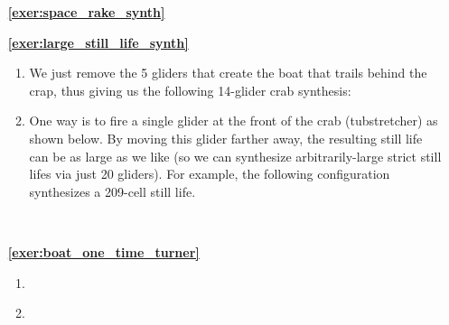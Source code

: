 \begin{multicols}{2}
\begin{itemize}[leftmargin=0em]
\begin{enumerate}[leftmargin=1.5em,label=\bf\color{ocre}(\alph*)]
			\item {} \\
		\end{enumerate}
		
		
		\item[\bf\color{ocre}\sffamily\ref{exer:space_rake_synth}]  \\
		
		
		\item[\bf\color{ocre}\sffamily\ref{exer:large_still_life_synth}]
		\begin{enumerate}[leftmargin=1.5em,label=\bf\color{ocre}(\alph*),series=solu_one_time]
			\item We just remove the 5 gliders that create the boat that trails behind the crap, thus giving us the following 14-glider crab synthesis:
			\begin{center}
			\end{center}
			
			\item One way is to fire a single glider at the front of the crab (tubstretcher) as shown below. By moving this glider farther away, the resulting still life can be as large as we like (so we can synthesize arbitrarily-large strict still lifes via just 20 gliders). For example, the following configuration synthesizes a 209-cell still life.
			\begin{center}
				 \\
			\end{center}
		\end{enumerate}
		
		
		\item[\bf\color{ocre}\sffamily\ref{exer:boat_one_time_turner}]
		\begin{enumerate}[leftmargin=1.5em,label=\bf\color{ocre}(\alph*),series=solu_one_time]
			\item {}
			
			\item {} \\
			

\end{enumerate}
\end{itemize}
\end{multicols}
